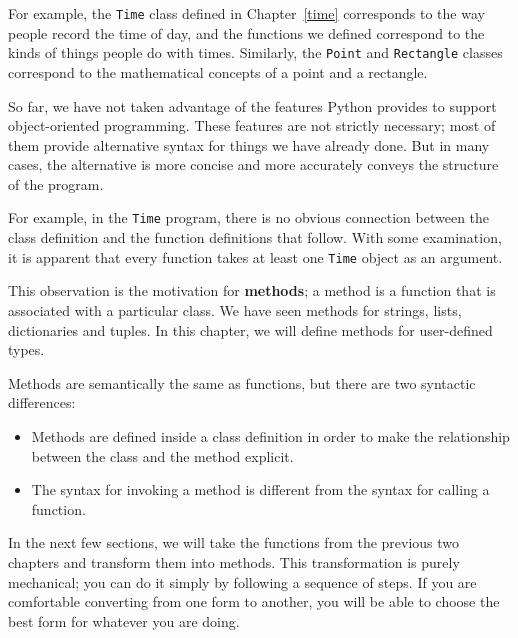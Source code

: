 \documentclass[10pt]{book}
\begin{document}
{\begin{itemize}
\end{itemize}

For example, the {\tt Time} class defined in Chapter~\ref{time}
corresponds to the way people record the time of day, and the
functions we defined correspond to the kinds of things people do with
times.  Similarly, the {\tt Point} and {\tt Rectangle} classes
correspond to the mathematical concepts of a point and a rectangle.

So far, we have not taken advantage of the features Python provides to
support object-oriented programming.  These
features are not strictly necessary; most of them provide
alternative syntax for things we have already done.  But in many cases,
the alternative is more concise and more accurately conveys the
structure of the program.

For example, in the {\tt Time} program, there is no obvious
connection between the class definition and the function definitions
that follow.  With some examination, it is apparent that every function
takes at least one {\tt Time} object as an argument.


This observation is the motivation for {\bf methods}; a method is
a function that is associated with a particular class.
We have seen methods for strings, lists, dictionaries and tuples.
In this chapter, we will define methods for user-defined types.


Methods are semantically the same as functions, but there are
two syntactic differences:

\begin{itemize}

\item Methods are defined inside a class definition in order
to make the relationship between the class and the method explicit.

\item The syntax for invoking a method is different from the
syntax for calling a function.

\end{itemize}

In the next few sections, we will take the functions from the previous
two chapters and transform them into methods.  This transformation is
purely mechanical; you can do it simply by following a sequence of
steps.  If you are comfortable converting from one form to another,
you will be able to choose the best form for whatever you are doing.


}
\end{document}
